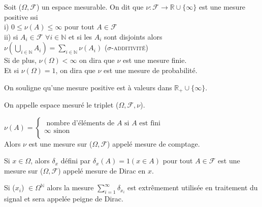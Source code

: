 \documentclass[landscape,twocolumn]{article}
\begin{document}
\begin{defin}[Mesure]
Soit ($\Omega, \mathcal{F}$) un espace mesurable. On dit que $\nu : \mathcal{F} \longrightarrow \mathbb{R} \cup \{\infty \}$ est une mesure positive ssi \\
i) $0 \leqslant \nu(A) \leqslant \infty$ pour tout $A \in \mathcal{F}$ \\
ii) si $A_i \in \mathcal{F}$ $\forall i \in \mathbb{N}$ et si les $A_i$ sont disjoints alors $\nu (\bigcup \limits_{i \in \mathbb{N}} A_i) = \sum \limits_{i \in \mathbb{N}} \nu(A_i)$ ($\sigma$-\textsc{additivité}) \\
Si de plus, $\nu (\Omega) < \infty$ on dira que $\nu$ est une mesure finie. \\
Et si $\nu(\Omega)=1$, on dira que $\nu$ est une mesure de probabilité.
\end{defin}

\begin{att}
On souligne qu'une mesure positive est à valeurs dans $\mathbb{R}_+ \cup \{ \infty \}$.
\end{att}

\begin{defin}
On appelle espace mesuré le triplet ($\Omega, \mathcal{F}, \nu $).
\end{defin}

\begin{exe}
$\nu(A)=
\left\{
\begin{array}{ll}
\mbox{ nombre d'éléments de } A \mbox{ si } A \mbox{ est fini }\\
\infty \mbox{ sinon } \\
\end{array}
\right.$ \\
Alors $\nu$ est une mesure sur ($\Omega, \mathcal{F}$) appelé mesure de comptage.
\end{exe}

\begin{exe}
Si $x \in \Omega$, alors $\delta_x$ défini par $\delta_x(A)=1(x \in A)$ pour tout $A \in \mathcal{F}$ est une mesure sur  ($\Omega, \mathcal{F}$) appelé mesure de Dirac en  $x$.
\end{exe}

\begin{exe}
Si ($x_i$) $\in \Omega^{\mathbb{N}}$ alors la mesure $\sum \limits_{i=1}^{\infty} \delta_{x_i}$ est extrêmement utilisée en traitement du signal et sera appelée peigne de Dirac.
\end{exe}
\end{document}
